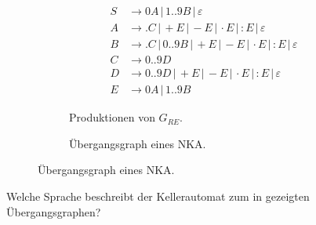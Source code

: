 \documentclass[fontsize=10pt, a4paper, ngerman]{scrartcl}
\begin{document}
\begin{figure}[h]
	\begin{subfigure}{.5\textwidth}
		\begin{align*}
		S &\rightarrow 0 A \,|\, 1..9 B \,|\, \varepsilon \\
		A &\rightarrow . C\,|\, +E \,|\, - E \,|\, \cdot E \,|\, : E \,|\, \varepsilon \\
		B &\rightarrow . C \,|\, 0..9 B \,|\, +E \,|\, - E \,|\, \cdot E \,|\, : E \,|\, \varepsilon \\
		C &\rightarrow 0..9 D \\
		D &\rightarrow 0..9 D \,|\, +E \,|\, - E \,|\, \cdot E \,|\, : E \,|\, \varepsilon \\
		E &\rightarrow 0 A \,|\, 1..9 B
		\end{align*}
		\caption{Produktionen von $G_{RE}$.}
		\label{abb:grammatik-rechenterme}
	\end{subfigure}%
	\begin{subfigure}{.5\textwidth}
		\begin{transitiongraph}[pa]
		\end{transitiongraph}
		\caption{Übergangsgraph eines NKA.}
		\label{abb:nka-palindrom}
	\end{subfigure}
\end{figure}

\begin{aufgabe}
\label{aufg:nka-palindrom}
Welche Sprache beschreibt der Kellerautomat zum in
 gezeigten Übergangsgraphen?
\end{aufgabe}
\end{document}
